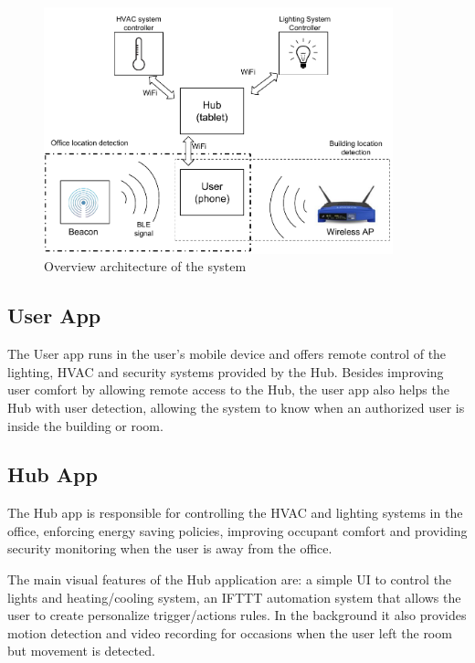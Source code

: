 \begin{figure}[h]
\centering
\includegraphics[width=0.9\textwidth]{Figures/harware_arch}
\caption{Overview architecture of the system}
\label{software1}
\end{figure}


\subsection{User App}

The User app runs in the user's mobile device and offers remote control of the lighting, \ac{HVAC} and security systems provided by the Hub. Besides improving user comfort by allowing remote access to the Hub, the user app also helps the Hub with user detection, allowing the system to know when an authorized user is inside the building or room.



\subsection{Hub App}

The Hub app is responsible for controlling the \ac{HVAC} and lighting systems in the office, enforcing energy saving policies, improving occupant comfort and providing security monitoring when the user is away from the office.

The main visual features of the Hub application are: a simple \ac{UI} to control the lights and heating/cooling system, an \ac{IFTTT} automation system that allows the user to create personalize trigger/actions rules. In the background it also provides motion detection and video recording for occasions when the user left the room but movement is detected.


